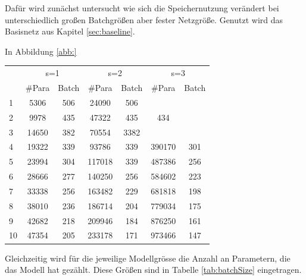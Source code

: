 Dafür wird zunächst untersucht wie sich die Speichernutzung verändert bei unterschiedlich großen Batchgrößen aber fester Netzgröße. Genutzt wird das Basisnetz aus Kapitel \ref{sec:baseline}. 

In Abbildung \ref{abb:}




\begin{table}[]
\begin{tabular}{c|c|c|c|c|c|c|}
\cline{2-7}
     & \multicolumn{2}{c|}{s=1}  & \multicolumn{2}{c|}{s=2}  & \multicolumn{2}{c|}{s=3}    \\ \cline{1-1}
\multicolumn{1}{|l|}{}   & \#Para      & Batch     & \#Para       & Batch     & \#Para & Batch  \\ \hline
\multicolumn{1}{|l|}{1}  & 5306        & 506       & 24090        & 506       \\ \hline
\multicolumn{1}{|l|}{2}  & 9978        & 435       & 47322        & 435       & 434        \\ \hline
\multicolumn{1}{|l|}{3}  & 14650       & 382       & 70554       & 3382        \\ \hline
\multicolumn{1}{|l|}{4}  & 19322       & 339       & 93786        & 339       & 390170      & 301        \\ \hline
\multicolumn{1}{|l|}{5}  & 23994       & 304       & 117018       & 339       & 487386      & 256        \\ \hline
\multicolumn{1}{|l|}{6}  & 28666       & 277       & 140250       & 256       & 584602      & 223        \\ \hline
\multicolumn{1}{|l|}{7}  & 33338       & 256       & 163482       & 229       & 681818      & 198        \\ \hline
\multicolumn{1}{|l|}{8}  & 38010       & 236       & 186714       & 204       & 779034      & 175        \\ \hline
\multicolumn{1}{|l|}{9}  & 42682       & 218       & 209946       & 184       & 876250      & 161        \\ \hline
 \multicolumn{1}{|l|}{10} & 47354      & 205       & 233178       & 171       & 973466      & 147        \\ \hline
\end{tabular}
\end{table}




Gleichzeitig wird für die jeweilige Modellgrösse die Anzahl an Parametern, die das Modell hat gezählt. Diese Größen sind in Tabelle \ref{tab:batchSize} eingetragen. 


